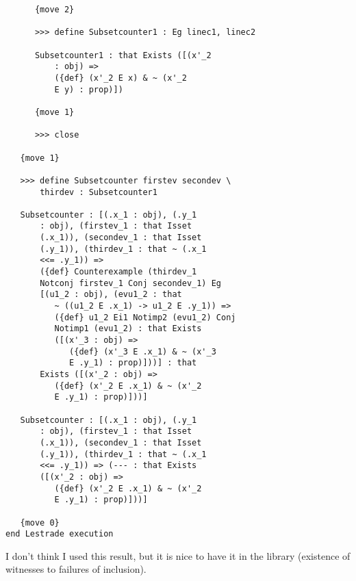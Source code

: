 \documentclass[12pt]{article}
\begin{document}
\begin{verbatim}
      {move 2}

      >>> define Subsetcounter1 : Eg linec1, linec2

      Subsetcounter1 : that Exists ([(x'_2 
          : obj) => 
          ({def} (x'_2 E x) & ~ (x'_2 
          E y) : prop)])

      {move 1}

      >>> close

   {move 1}

   >>> define Subsetcounter firstev secondev \
       thirdev : Subsetcounter1

   Subsetcounter : [(.x_1 : obj), (.y_1 
       : obj), (firstev_1 : that Isset 
       (.x_1)), (secondev_1 : that Isset 
       (.y_1)), (thirdev_1 : that ~ (.x_1 
       <<= .y_1)) => 
       ({def} Counterexample (thirdev_1 
       Notconj firstev_1 Conj secondev_1) Eg 
       [(u1_2 : obj), (evu1_2 : that 
          ~ ((u1_2 E .x_1) -> u1_2 E .y_1)) => 
          ({def} u1_2 Ei1 Notimp2 (evu1_2) Conj 
          Notimp1 (evu1_2) : that Exists 
          ([(x'_3 : obj) => 
             ({def} (x'_3 E .x_1) & ~ (x'_3 
             E .y_1) : prop)]))] : that 
       Exists ([(x'_2 : obj) => 
          ({def} (x'_2 E .x_1) & ~ (x'_2 
          E .y_1) : prop)]))]

   Subsetcounter : [(.x_1 : obj), (.y_1 
       : obj), (firstev_1 : that Isset 
       (.x_1)), (secondev_1 : that Isset 
       (.y_1)), (thirdev_1 : that ~ (.x_1 
       <<= .y_1)) => (--- : that Exists 
       ([(x'_2 : obj) => 
          ({def} (x'_2 E .x_1) & ~ (x'_2 
          E .y_1) : prop)]))]

   {move 0}
end Lestrade execution
\end{verbatim}

I don't think I used this result, but it is nice to have it in the library (existence of witnesses to failures of inclusion).
\end{document}
